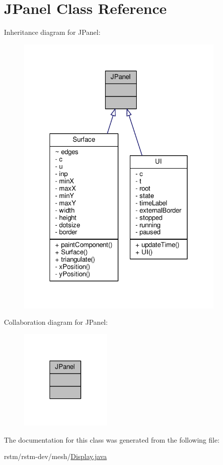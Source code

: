 \hypertarget{classJPanel}{\section{J\-Panel Class Reference}
\label{classJPanel}
}


Inheritance diagram for J\-Panel\-:
\nopagebreak
\begin{figure}[H]
\begin{center}
\leavevmode
\includegraphics[width=287pt]{classJPanel__inherit__graph}
\end{center}
\end{figure}


Collaboration diagram for J\-Panel\-:
\nopagebreak
\begin{figure}[H]
\begin{center}
\leavevmode
\includegraphics[width=126pt]{classJPanel__coll__graph}
\end{center}
\end{figure}


The documentation for this class was generated from the following file\-:\begin{DoxyCompactItemize}
\item 
rstm/rstm-\/dev/mesh/\hyperlink{Display_8java}{Display.\-java}\end{DoxyCompactItemize}
